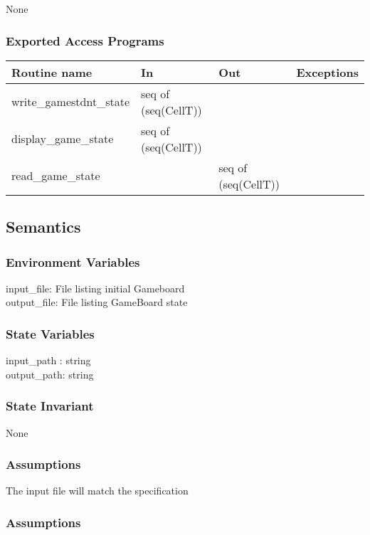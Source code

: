 \documentclass[12pt]{article}
\begin{document}
None

\subsubsection* {Exported Access Programs}

\begin{tabular}{| l | l | l | l |}
\hline
\textbf{Routine name} & \textbf{In} & \textbf{Out} & \textbf{Exceptions}\\
\hline
write\_gamestdnt\_state & seq of (seq(CellT)) & ~ & ~\\
\hline
display\_game\_state & seq of (seq(CellT)) & ~ & ~\\
\hline
read\_game\_state &~ & seq of (seq(CellT)) & ~\\
\hline
\end{tabular}

\subsection* {Semantics}

\subsubsection* {Environment Variables}

input\_file: File listing initial Gameboard\\
output\_file: File listing GameBoard state

\subsubsection* {State Variables}
input\_path : string \\
output\_path: string\\

\subsubsection* {State Invariant}

None


\subsubsection* {Assumptions}

The input file will match the specification 




\subsubsection* {Assumptions}
\end{document}
